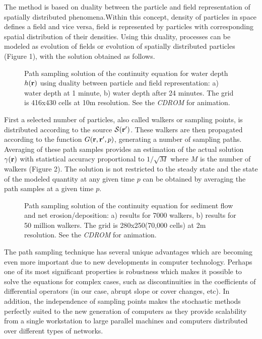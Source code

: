 \documentclass{kapedbk} %
\begin{document}
The method is based on duality between the particle and field 
representation of spatially distributed phenomena.Within this concept,
 density of particles in
space defines a field and vice versa, field is represented by
particles with corresponding spatial distribution of their densities. Using
this duality, processes can be modeled as evolution of fields or evolution 
of spatially distributed particles (Figure 1), 
with the solution obtained as follows.  

\begin{figure}[h]
\centerline{}
\caption{Path sampling solution of the continuity equation for water 
depth $h({\bf r})$ using duality between particle and field representation:
a) water depth at 1 minute, b) water depth after 24 minutes. The grid
is 416x430 cells at 10m resolution. See the {\sl CDROM} for animation.}
\end{figure}

 First a selected number of particles, also called walkers or sampling points,
is distributed according to the source 
$ {\cal S}({\bf r'})$. These walkers are then propagated
 according to the function $G({\bf r},{\bf r'},p)$, generating a number
of sampling paths. Averaging of these path samples provides
 an estimation of the actual solution $ \gamma ({\bf r})$ 
 with statistical accuracy proportional to $1/\sqrt{M}$ where $M$ 
is the number of walkers (Figure 2). The solution is not restricted to the 
steady state and the state of the modeled quantity at any given time
$p$ can be obtained by averaging the path samples at a given time $p$.   

\begin{figure}[h]
\centerline{  }
\caption{Path sampling solution of the continuity equation for sediment
flow and net erosion/deposition:
a) results for 7000 walkers, b) results for 50 million walkers.
 The grid is 280x250(70,000 cells) at 2m resolution. See the {\sl CDROM} 
for animation.}
\medskip
\end{figure}

The path sampling technique has several unique advantages which
are becoming even more important due to new developments in
computer technology. Perhaps one of its most significant
 properties is robustness which makes it possible to solve the equations
 for complex cases, such as discontinuities in
 the coefficients of differential operators (in our case, abrupt
 slope or cover changes, etc). In addition, the independence of sampling points
makes the stochastic methods perfectly suited to
the new generation of computers as they provide scalability from
a single workstation to large parallel
 machines and computers distributed over different types of networks.
\end{document}
